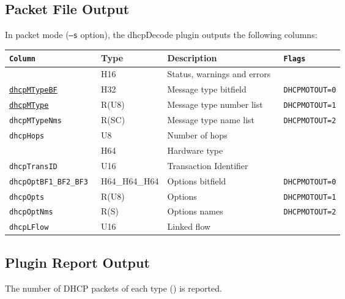 \documentclass[documentation]{subfiles}
\begin{document}
\subsection{Packet File Output}
In packet mode ({\tt --s} option), the dhcpDecode plugin outputs the following columns:
\begin{longtable}{>{\tt}lll>{\tt\small}l}
    \toprule
    {\bf Column}                      & {\bf Type}    & {\bf Description}                         & {\bf Flags}\\
    \midrule\endhead%
    \nameref{dhcpStat}                & H16           & Status, warnings and errors               & \\
    \hyperref[dhcpMType]{dhcpMTypeBF} & H32           & Message type bitfield                     & DHCPMOTOUT=0\\
    \hyperref[dhcpMType]{dhcpMType}   & R(U8)         & Message type number list                  & DHCPMOTOUT=1\\
    dhcpMTypeNms                      & R(SC)         & Message type name list                    & DHCPMOTOUT=2\\
    dhcpHops                          & U8            & Number of hops                            & \\
    \nameref{dhcpHWType}              & H64           & Hardware type                             & \\
    dhcpTransID                       & U16           & Transaction Identifier                    & \\
    dhcpOptBF1\_BF2\_BF3              & H64\_H64\_H64 & Options bitfield                          & DHCPMOTOUT=0\\
    dhcpOpts                          & R(U8)         & Options                                   & DHCPMOTOUT=1\\
    dhcpOptNms                        & R(S)          & Options names                             & DHCPMOTOUT=2\\
    dhcpLFlow                         & U16           & Linked flow                               & \\
    \bottomrule
\end{longtable}

\subsection{Plugin Report Output}
The number of DHCP packets of each type () is reported.
\end{document}
